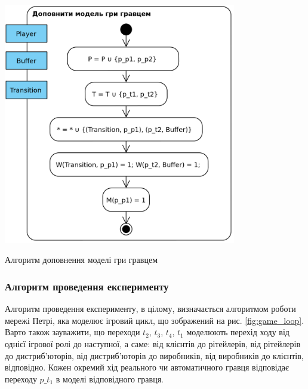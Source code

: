 \begin{stdfigure}  
    \includegraphics[width=4in]{images/add_player.png}
    \caption{Алгоритм доповнення моделі гри гравцем}
    \label{fig:net_add_player}
\end{stdfigure}

\subsubsection{Алгоритм проведення експерименту}
Алгоритм проведення експерименту, в цілому, визначається алгоритмом роботи мережі Петрі, яка моделює ігровий цикл, що зображений на рис. \ref{fig:game_loop}. Варто також зауважити, що переходи $t_2$, $t_3$, $t_4$, $t_1$ моделюють перехід ходу від однієї ігрової ролі до наступної, а саме: від клієнтів до рітейлерів, від рітейлерів до дистриб’юторів, від дистриб’юторів до виробників, від виробників до клієнтів, відповідно. Кожен окремий хід реального чи автоматичного гравця відповідає переходу $p\_t_1$ в моделі відповідного гравця.

 
